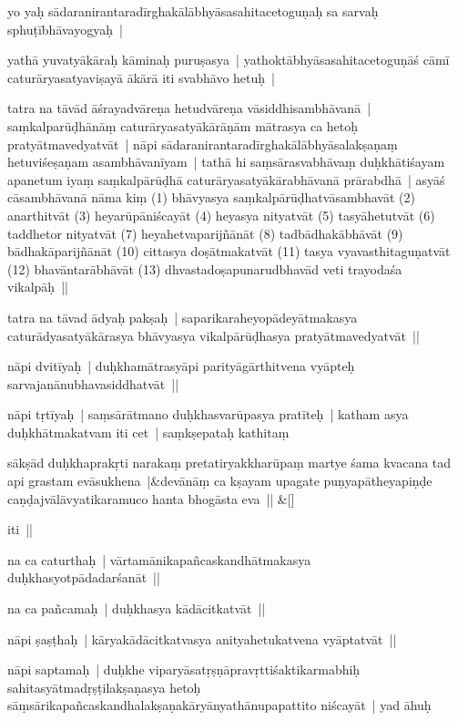 \documentclass[article,12pt,a4paper]{memoir}
\begin{document}
	  \pstart yo yaḥ sādaranirantaradīrghakālābhyāsasahitacetoguṇaḥ sa sarvaḥ sphuṭībhāvayogyaḥ | 
	\pend
      

	  \pstart yathā yuvatyākāraḥ kāminaḥ puruṣasya | yathoktābhyāsasahitacetoguṇāś cāmī caturāryasatyaviṣayā ākārā iti svabhāvo hetuḥ | 
	\pend
      

	  \pstart tatra na tāvād āśrayadvāreṇa hetudvāreṇa vāsiddhisambhāvanā | saṃkalparūḍhānāṃ caturāryasatyākārāṇām mātrasya ca hetoḥ pratyātmavedyatvāt | nāpi sādaranirantaradīrghakālābhyāsalakṣaṇaṃ hetuviśeṣaṇam asambhāvanīyam | tathā hi saṃsārasvabhāvaṃ duḥkhātiśayam apanetum iyaṃ saṃkalpārūḍhā caturāryasatyākārabhāvanā prārabdhā | asyāś cāsambhāvanā nāma kiṃ (1) bhāvyasya saṃkalpārūḍhatvāsambhavāt (2) anarthitvāt (3) heyarūpāniścayāt (4) heyasya nityatvāt (5) tasyāhetutvāt (6) taddhetor nityatvāt (7) heyahetvaparijñānāt (8) tadbādhakābhāvāt (9) bādhakāparijñānāt (10) cittasya doṣātmakatvāt (11) tasya vyavasthitaguṇatvāt (12) bhavāntarābhāvāt (13) dhvastadoṣapunarudbhavād veti trayodaśa vikalpāḥ ||
	\pend
      

	  \pstart tatra na tāvad ādyaḥ pakṣaḥ | saparikaraheyopādeyātmakasya caturādyasatyākārasya bhāvyasya vikalpārūḍhasya pratyātmavedyatvāt || 
	\pend
      

	  \pstart {}\label{thakur75-2.9} nāpi dvitīyaḥ | duḥkhamātrasyāpi parityāgārthitvena vyāpteḥ sarvajanānubhavasiddhatvāt ||
	\pend
      

	  \pstart nāpi tṛtīyaḥ | saṃsārātmano duḥkhasvarūpasya pratīteḥ | katham asya duḥkhātmakatvam iti cet | saṃkṣepataḥ kathitaṃ 
	\pend
      
	    
	    \stanza[\smallbreak]
	sākṣād duḥkhaprakṛti narakaṃ pretatiryakkharūpaṃ martye śama kvacana tad api grastam evāsukhena |&devānāṃ ca kṣayam upagate puṇyapātheyapiṇḍe caṇḍajvālāvyatikaramuco hanta bhogāsta eva || \&[\smallbreak]


	

	  \pstart iti || 
	\pend
      

	  \pstart na ca caturthaḥ | vārtamānikapañcaskandhātmakasya duḥkhasyotpādadarśanāt || 
	\pend
      

	  \pstart na ca pañcamaḥ | duḥkhasya kādācitkatvāt || 
	\pend
      

	  \pstart nāpi ṣaṣṭhaḥ | kāryakādācitkatvasya anityahetukatvena vyāptatvāt || 
	\pend
      

	  \pstart nāpi saptamaḥ | duḥkhe viparyāsatṛṣṇāpravṛttiśaktikarmabhiḥ sahitasyātmadṛṣṭilakṣaṇasya hetoḥ sāṃsārikapañcaskandhalakṣaṇakāryānyathānupapattito niścayāt | yad āhuḥ 
	\pend
      
\end{document}
